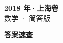 \documentclass[zihao=-4, a4paper]{ctexart}
\begin{document}
\begin{center}
  {\Large\bfseries 2018 年·上海卷}\\[4pt]
  {\large 数学 · 简答版}
\end{center}
\medskip
{}

\clearpage
{}
\begin{center}{\Large\bfseries 答案速查}\end{center}
\medskip

\end{document}
